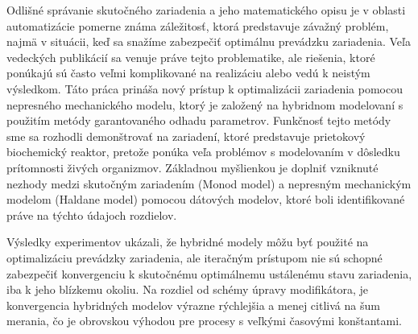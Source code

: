 Odlišné správanie skutočného zariadenia a jeho matematického opisu je v oblasti automatizácie pomerne známa záležitosť, ktorá predstavuje závažný problém, najmä v situácii, keď sa snažíme zabezpečiť optimálnu prevádzku zariadenia. Veľa vedeckých publikácií sa venuje práve tejto problematike, ale riešenia, ktoré ponúkajú sú často veľmi komplikované na realizáciu alebo vedú k neistým výsledkom. Táto práca prináša nový prístup k optimalizácii zariadenia pomocou nepresného mechanického modelu, ktorý je založený na hybridnom modelovaní s použitím metódy garantovaného odhadu parametrov. Funkčnosť tejto metódy sme sa rozhodli demonštrovať na zariadení, ktoré predstavuje prietokový biochemický reaktor, pretože ponúka veľa problémov s modelovaním v dôsledku prítomnosti živých organizmov. Základnou myšlienkou je doplniť vzniknuté nezhody medzi skutočným zariadením (Monod model) a nepresným mechanickým modelom (Haldane model) pomocou dátových modelov, ktoré boli identifikované práve na týchto údajoch rozdielov.

Výsledky experimentov ukázali, že hybridné modely môžu byť použité na optimalizáciu prevádzky zariadenia, ale iteračným prístupom nie sú schopné zabezpečiť konvergenciu k skutočnému optimálnemu ustálenému stavu zariadenia, iba k jeho blízkemu okoliu. Na rozdiel od schémy úpravy modifikátora, je konvergencia hybridných modelov výrazne rýchlejšia a menej citlivá na šum merania, čo je obrovskou výhodou pre procesy s veľkými časovými konštantami.